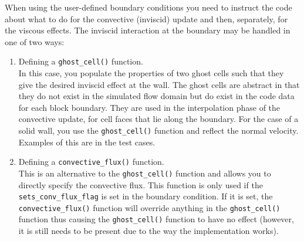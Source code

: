 When using the user-defined boundary conditions you need to instruct the code about 
what to do for the convective (inviscid) update and then, separately, for the viscous effects. 
The inviscid interaction at the boundary may be handled in one of two ways:
\begin{enumerate}
 \item Defining a \verb!ghost_cell()! function.\\
  In this case, you populate the properties of two ghost cells such that 
  they give the desired inviscid effect at the wall. 
  The ghost cells are abstract in that they do not exist in the simulated flow domain
  but do exist in the code data for each block boundary. 
  They are used in the interpolation phase of the convective update,
  for cell faces that lie along the boundary.
  For the case of a solid wall, you use the \verb!ghost_cell()! function 
  and reflect the normal velocity.
  Examples of this are in the test cases.
 \item Defining a \verb!convective_flux()! function. \\
  This is an alternative to the \verb!ghost_cell()! function and
  allows you to directly specify the convective flux. 
  This function is only used if the \verb!sets_conv_flux_flag! is set in the boundary condition. 
  If it is set, the \verb!convective_flux()! function will override anything in the \verb!ghost_cell()! function
  thus causing the \verb!ghost_cell()! function to have no effect (however, it is still needs to be present due to the
  way the implementation works).
\end{enumerate}

